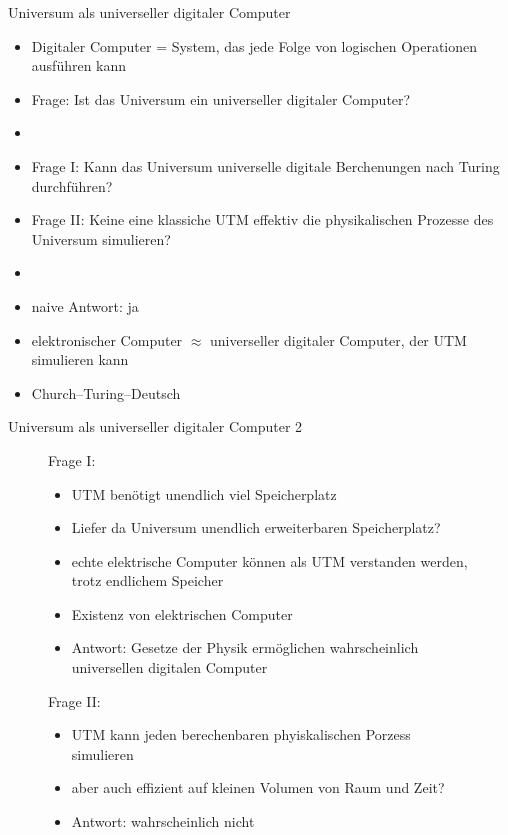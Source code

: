 \documentclass[aspectratio=1610, 9pt]{beamer}
\begin{document}
\begin{frame}{Universum als universeller digitaler Computer}
  \begin{itemize}
    \item Digitaler Computer = System, das jede Folge von logischen Operationen ausführen kann
    \item Frage: Ist das Universum ein universeller digitaler Computer?
    \item[]
    \item[\rightarrow] Frage I: Kann das Universum universelle digitale Berchenungen nach Turing durchführen?
    \item[\rightarrow] Frage II: Keine eine klassiche UTM effektiv die physikalischen Prozesse des Universum simulieren?
    \item[]
    \item naive Antwort: ja
    \item elektronischer Computer $\approx$ universeller digitaler Computer, der UTM simulieren kann
    \item Church–Turing–Deutsch
  \end{itemize}

\end{frame}

\begin{frame}{Universum als universeller digitaler Computer 2}
  \begin{figure}
    \begin{minipage}{0.49\textwidth}
      Frage I:
      \begin{itemize}
        \item UTM benötigt unendlich viel Speicherplatz
        \item Liefer da Universum unendlich erweiterbaren Speicherplatz?
        \item echte elektrische Computer können als UTM verstanden werden, trotz endlichem Speicher
        \item Existenz von elektrischen Computer
        \item[\rightarrow] Antwort: Gesetze der Physik ermöglichen wahrscheinlich universellen digitalen Computer
      \end{itemize}
    \end{minipage}
    \hfill
    \begin{minipage}{0.49\textwidth}
      Frage II:
      \begin{itemize}
        \item UTM kann jeden berechenbaren phyiskalischen Porzess simulieren
        \item aber auch effizient auf kleinen Volumen von Raum und Zeit?
        \item[\rightarrow] Antwort: wahrscheinlich nicht
      \end{itemize}
    \end{minipage}
  \end{figure}
\end{frame}
\end{document}
